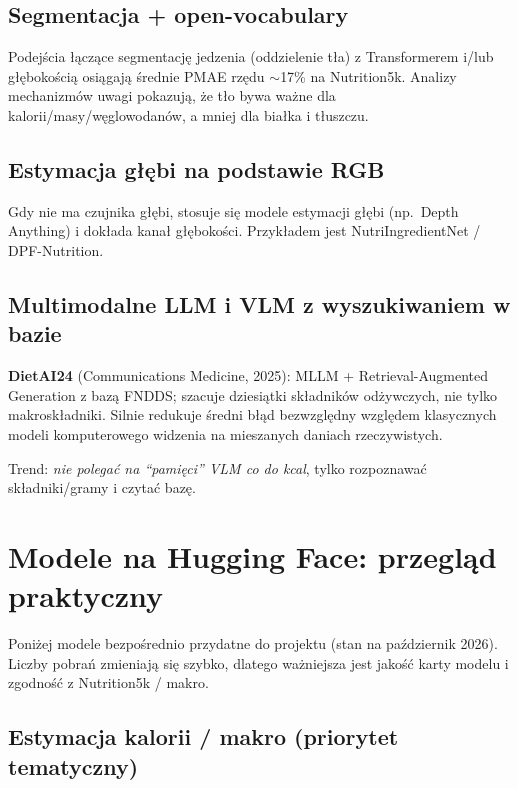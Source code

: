 \documentclass[11pt,a4paper]{article}
\begin{document}
\subsection{Segmentacja + open-vocabulary}
Podejścia łączące segmentację jedzenia (oddzielenie tła) z Transformerem
i/lub głębokością osiągają średnie PMAE rzędu $\sim$17\% na Nutrition5k.
Analizy mechanizmów uwagi pokazują, że tło bywa ważne dla kalorii/masy/węglowodanów,
a mniej dla białka i tłuszczu.

\subsection{Estymacja głębi na podstawie RGB}
Gdy nie ma czujnika głębi, stosuje się modele estymacji głębi
(np.\ Depth Anything) i dokłada kanał głębokości. Przykładem jest
NutriIngredientNet / DPF-Nutrition.

\subsection{Multimodalne LLM i VLM z wyszukiwaniem w bazie}
\textbf{DietAI24} (Communications Medicine, 2025): MLLM + Retrieval-Augmented
Generation z bazą FNDDS; szacuje dziesiątki składników odżywczych,
nie tylko makroskładniki. Silnie redukuje średni błąd bezwzględny
względem klasycznych modeli komputerowego widzenia
na mieszanych daniach rzeczywistych.

Trend: \emph{nie polegać na ``pamięci'' VLM co do kcal}, tylko
rozpoznawać składniki/gramy i czytać bazę.

\section{Modele na Hugging Face: przegląd praktyczny}

Poniżej modele bezpośrednio przydatne do projektu (stan na październik 2026).
Liczby pobrań zmieniają się szybko, dlatego ważniejsza jest jakość karty modelu
i zgodność z Nutrition5k / makro.

\subsection{Estymacja kalorii / makro (priorytet tematyczny)}
\end{document}
